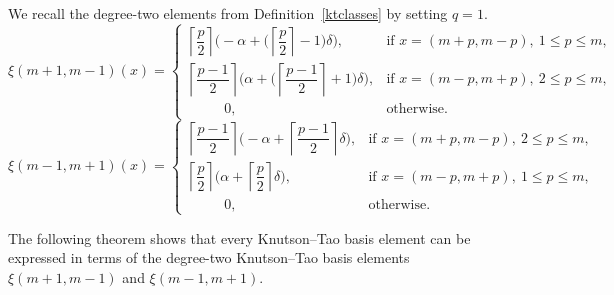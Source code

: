 \documentclass[10pt, a4paper, reqno]{amsart}
\begin{document}
\begin{defe}
	\label{def:degree_two_generators}
	We recall the degree-two elements from Definition~\ref{ktclasses} by setting $q=1$.
	\[
	\xi(m+1,m-1)(x)=
	\begin{cases}
		\left\lceil \dfrac{p}{2} \right\rceil \Big(-\alpha + \big(\left\lceil \dfrac{p}{2} \right\rceil -1\big)\delta\Big), & \text{if } x=(m+p,m-p),~1\leq p\leq m, \\[6pt]
		\left\lceil \dfrac{p-1}{2} \right\rceil \Big(\alpha + \big(\left\lceil \dfrac{p-1}{2} \right\rceil +1\big)\delta\Big), & \text{if } x=(m-p,m+p),~2\leq p\leq m, \\[6pt]
	~~~~~~~~~~~~	0, & \text{otherwise.}
	\end{cases}
	\]
	\[
	\xi(m-1,m+1)(x)=
	\begin{cases}
		\left\lceil \dfrac{p-1}{2} \right\rceil \Big(-\alpha + \left\lceil \dfrac{p-1}{2} \right\rceil \delta\Big), & \text{if } x=(m+p,m-p),~2\leq p\leq m, \\[6pt]
		\left\lceil \dfrac{p}{2} \right\rceil \Big(\alpha + \left\lceil \dfrac{p}{2} \right\rceil \delta\Big), & \text{if } x=(m-p,m+p),~1\leq p\leq m, \\[6pt]
	~~~~~~~~~~~~	0, & \text{otherwise.}
	\end{cases}
	\]
\end{defe}

	



	The following theorem shows that every Knutson--Tao basis element can be expressed in terms of the degree-two Knutson--Tao basis elements $\xi(m+1,m-1)$ and $\xi(m-1,m+1)$.
	
\end{document}
